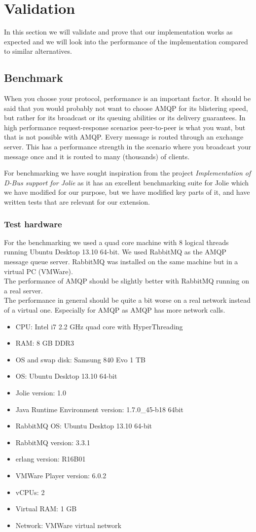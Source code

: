 \section{Validation}
In this section we will validate and prove that our implementation works as expected and we will look into the performance of the implementation compared to similar alternatives.
\subsection{Benchmark}
When you choose your protocol, performance is an important factor. It should be said that you would probably not want to choose AMQP for its blistering speed, but rather for its broadcast or its queuing abilities or its delivery guarantees. In high performance request-response scenarios peer-to-peer is what you want, but that is not possible with AMQP. Every message is routed through an exchange server. This has a performance strength in the scenario where you broadcast your message once and it is routed to many (thousands) of clients.

For benchmarking we have sought inspiration from the project \textit{Implementation of D-Bus support for Jolie}\cite{D-Bus} as it has an excellent benchmarking suite for Jolie which we have modified for our purpose, but we have modified key parts of it, and have written tests that are relevant for our extension.
\subsubsection{Test hardware}
For the benchmarking we used a quad core machine with 8 logical threads running Ubuntu Desktop 13.10 64-bit. We used RabbitMQ as the AMQP message queue server. RabbitMQ was installed on the same machine but in a virtual PC (VMWare).\\
The performance of AMQP should be slightly better with RabbitMQ running on a real server.\\
The performance in general should be quite a bit worse on a real network instead of a virtual one. Especially for AMQP as AMQP has more network calls.
\begin{itemize}
\item CPU: Intel i7 2.2 GHz quad core with HyperThreading
\item RAM: 8 GB DDR3
\item OS and swap disk: Samsung 840 Evo 1 TB
\item OS: Ubuntu Desktop 13.10 64-bit
\item Jolie version: 1.0
\item Java Runtime Environment version: 1.7.0_45-b18 64bit
\item RabbitMQ OS: Ubuntu Desktop 13.10 64-bit
\item RabbitMQ version: 3.3.1
\item erlang version: R16B01
\item VMWare Player version: 6.0.2
\item vCPUs: 2
\item Virtual RAM: 1 GB
\item Network: VMWare virtual network
\end{itemize}
